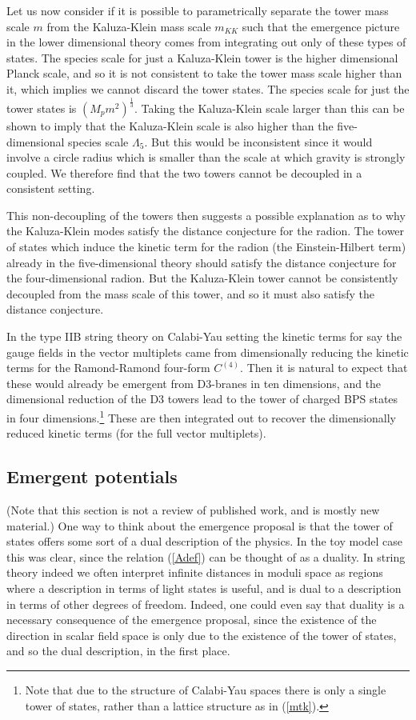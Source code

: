 \documentclass[11pt,a4paper]{article}
\numberwithin{equation}{section}
\numberwithin{table}{section}\setlength{\multlinegap}{25pt}
\begin{document}
{Let us now consider if it is possible to parametrically separate the tower mass scale $m$ from the Kaluza-Klein mass scale $m_{KK}$ such that the emergence picture in the lower dimensional theory comes from integrating out only of these types of states. The species scale for just a Kaluza-Klein tower is the higher dimensional Planck scale, and so it is not consistent to take the tower mass scale higher than it, which implies we cannot discard the tower states. The species scale for just the tower states is $\left(M_p m^2 \right)^{\frac13}$. Taking the Kaluza-Klein scale larger than this can be shown to imply that the Kaluza-Klein scale is also higher than the five-dimensional species scale $\Lambda_5$. But this would be inconsistent since it would involve a circle radius which is smaller than the scale at which gravity is strongly coupled. We therefore find that the two towers cannot be decoupled in a consistent setting. 

This non-decoupling of the towers then suggests a possible explanation as to why the Kaluza-Klein modes satisfy the distance conjecture for the radion. The tower of states which induce the kinetic term for the radion (the Einstein-Hilbert term) already in the five-dimensional theory should satisfy the distance conjecture for the four-dimensional radion. But the Kaluza-Klein tower cannot be consistently decoupled from the mass scale of this tower, and so it must also satisfy the distance conjecture. 

In the type IIB string theory on Calabi-Yau setting the kinetic terms for say the gauge fields in the vector multiplets came from dimensionally reducing the kinetic terms for the Ramond-Ramond four-form $C^{(4)}$. Then it is natural to expect that these would already be emergent from D3-branes in ten dimensions, and the dimensional reduction of the D3 towers lead to the tower of charged BPS states in four dimensions.\footnote{Note that due to the structure of Calabi-Yau spaces there is only a single tower of states, rather than a lattice structure as in (\ref{mtk}).} These are then integrated out to recover the dimensionally reduced kinetic terms (for the full vector multiplets).

\subsection{Emergent potentials}
\label{sec:empot}

(Note that this section is not a review of published work, and is mostly new material.) One way to think about the emergence proposal is that the tower of states offers some sort of a dual description of the physics. In the toy model case this was clear, since the relation (\ref{Adef}) can be thought of as a duality. In string theory indeed we often interpret infinite distances in moduli space as regions where a description in terms of light states is useful, and is dual to a description in terms of other degrees of freedom. Indeed, one could even say that duality is a necessary consequence of the emergence proposal, since the existence of the direction in scalar field space is only due to the existence of the tower of states, and so the dual description, in the first place.

}
\end{document}
